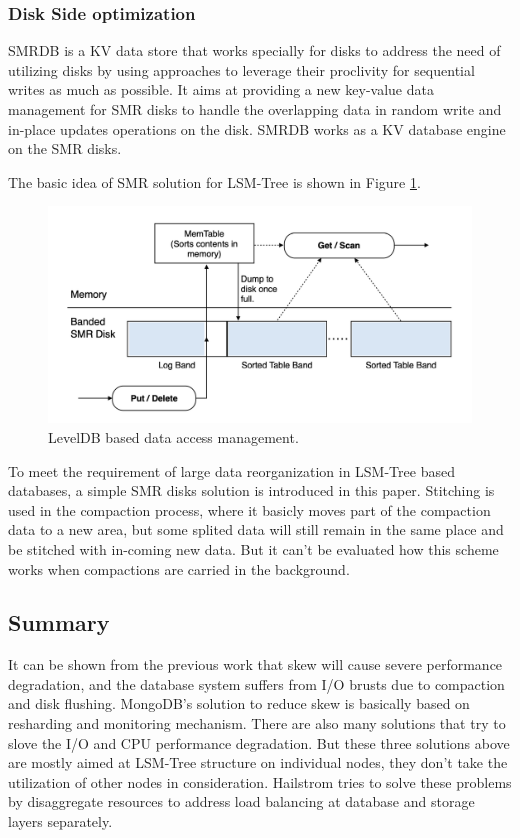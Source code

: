 \documentclass[a4paper,10pt,twoside]{article}
\begin{document}
\subsubsection{Disk Side optimization}
SMRDB \cite{SMRDB} is a KV data store that works specially for disks to address the need of utilizing disks by using approaches to leverage their proclivity for sequential writes as much as possible.
It aims at providing a new key-value data management for SMR disks to handle the overlapping data in random write and in-place updates operations on the disk.
SMRDB works as a KV database engine on the SMR disks. 
\par
The basic idea of SMR solution for LSM-Tree is shown in Figure \ref{fig:mesh4}.
\begin{figure}[h]
    \centering
	\includegraphics[scale=0.3]{SMR.png}
    \caption{ LevelDB based data access management. \cite{SMRDB}}
    \label{fig:mesh4}
\end{figure}
To meet the requirement of large data reorganization in LSM-Tree based databases, a simple SMR disks solution is introduced in this paper.
Stitching is used in the compaction process, where it basicly moves part of the compaction data to a new area, 
but some splited data will still remain in the same place and be stitched with in-coming new data.
But it can't be evaluated how this scheme works when compactions are carried in the background.

\subsection{Summary}
It can be shown from the previous work that skew will cause severe performance degradation, and the database system suffers from I/O brusts due to compaction and disk flushing.
MongoDB's solution to reduce skew is basically based on resharding and monitoring mechanism.
There are also many solutions that try to slove the I/O and CPU performance degradation.
But these three solutions above are mostly aimed at LSM-Tree structure on individual nodes, they don't take the utilization of other nodes in consideration.
Hailstrom tries to solve these problems by disaggregate resources to address load balancing at database and storage layers separately.
\end{document}
